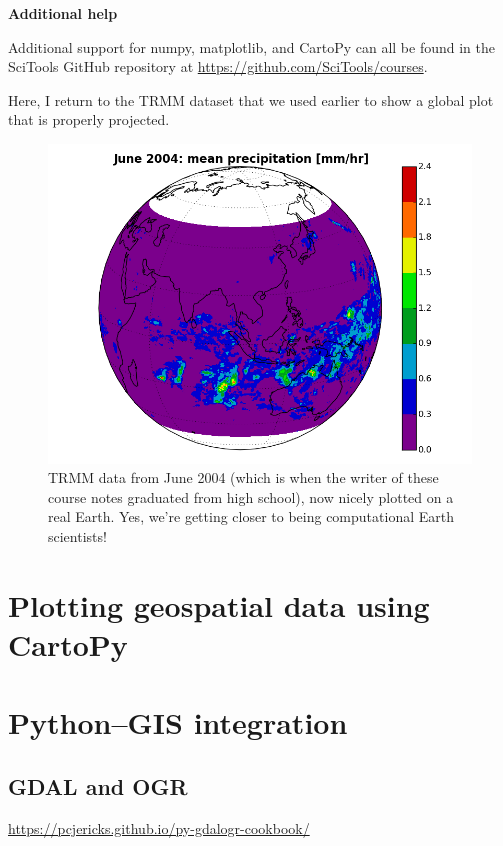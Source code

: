 \documentclass[a4paper,10pt]{scrartcl}
\begin{document}
\begin{framed}
\noindent\textbf{Additional help}

Additional support for numpy, matplotlib, and CartoPy can all be found in the SciTools GitHub repository at \url{https://github.com/SciTools/courses}.
\end{framed}

Here, I return to the TRMM dataset that we used earlier to show a global plot that is properly projected.



\begin{figure}[!ht]
\begin{center}
\includegraphics[width=.9\linewidth]{figures/FilesData/EasternHemispherePrecip.png}
\end{center}
\caption{TRMM data from June 2004 (which is when the writer of these course notes graduated from high school), now nicely plotted on a real Earth. Yes, we're getting closer to being computational Earth scientists!}
\end{figure}

\section{Plotting geospatial data using CartoPy}

\section{Python--GIS integration}

\subsection{GDAL and OGR}

\url{https://pcjericks.github.io/py-gdalogr-cookbook/}
\end{document}
